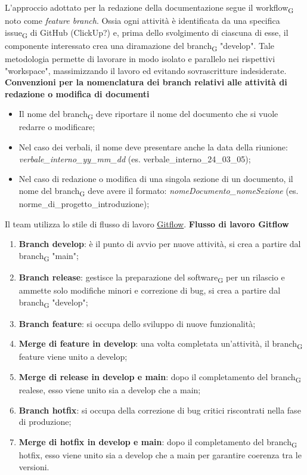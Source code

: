 L'approccio adottato per la redazione della documentazione segue il {workflow\textsubscript{G}} noto come \textit{feature branch}.
Ossia ogni attività è identificata da una specifica {issue\textsubscript{G}} di GitHub (ClickUp?) e, prima dello svolgimento di
ciascuna di esse, il componente interessato crea una diramazione del {branch\textsubscript{G}} "develop". Tale metodologia
permette di lavorare in modo isolato e parallelo nei rispettivi "workspace", massimizzando il lavoro ed evitando sovrascritture indesiderate.
\textbf{Convenzioni per la nomenclatura dei branch relativi alle attività di redazione o modifica di documenti} \label{convenzioni_nomenclatura}
\begin{itemize}
    \item Il nome del {branch\textsubscript{G}} deve riportare il nome del documento che si vuole redarre o modificare;
    \item Nel caso dei verbali, il nome deve presentare anche la data della riunione: \textit{verbale\_interno\_yy\_mm\_dd} (es. verbale\_interno\_24\_03\_05);
    \item Nel caso di redazione o modifica di una singola sezione di un documento, il nome del {branch\textsubscript{G}} deve avere il formato:
    \textit{nomeDocumento\_nomeSezione} (es. norme\_di\_progetto\_introduzione);
\end{itemize}

Il team utilizza lo stile di flusso di lavoro \href{https://www.atlassian.com/it/git/tutorials/comparing-workflows/gitflow-workflow}{\underline{{Gitflow}}}.
\textbf{Flusso di lavoro Gitflow}
\begin{enumerate}
    \item \textbf{Branch develop}: è il punto di avvio per nuove attività, si crea a partire dal {branch\textsubscript{G}} "main";
    \item \textbf{Branch release}: gestisce la preparazione del {software\textsubscript{G}} per un rilascio e ammette solo
        modifiche minori e correzione di bug, si crea a partire dal {branch\textsubscript{G}} "develop";
    \item \textbf{Branch feature}: si occupa dello sviluppo di nuove funzionalità;
    \item \textbf{Merge di feature in develop}: una volta completata un'attività, il {branch\textsubscript{G}} feature viene
        unito a develop;
    \item \textbf{Merge di release in develop e main}: dopo il completamento del {branch\textsubscript{G}} realese, esso viene
        unito sia a develop che a main;
    \item \textbf{Branch hotfix}: si occupa della correzione di bug critici riscontrati nella fase di produzione;
    \item \textbf{Merge di hotfix in develop e main}: dopo il completamento del {branch\textsubscript{G}} hotfix, esso viene
        unito sia a develop che a main per garantire coerenza tra le versioni.
\end{enumerate}

